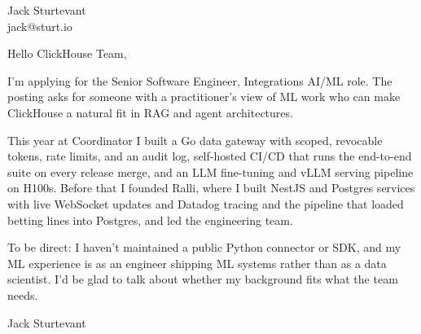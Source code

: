 \documentclass[11pt]{article}
\begin{document}
\raggedright

{\namefont\fontsize{20pt}{24pt}\selectfont Jack Sturtevant}\\[-0.3em]
jack@sturt.io

\vspace{1.2em}

Hello ClickHouse Team,

I'm applying for the Senior Software Engineer, Integrations AI/ML role. The posting asks for someone with a practitioner's view of ML work who can make ClickHouse a natural fit in RAG and agent architectures.

This year at Coordinator I built a Go data gateway with scoped, revocable tokens, rate limits, and an audit log, self-hosted CI/CD that runs the end-to-end suite on every release merge, and an LLM fine-tuning and vLLM serving pipeline on H100s. Before that I founded Ralli, where I built NestJS and Postgres services with live WebSocket updates and Datadog tracing and the pipeline that loaded betting lines into Postgres, and led the engineering team.

To be direct: I haven't maintained a public Python connector or SDK, and my ML experience is as an engineer shipping ML systems rather than as a data scientist. I'd be glad to talk about whether my background fits what the team needs.

\vspace{0.6em}
Jack Sturtevant
\end{document}
